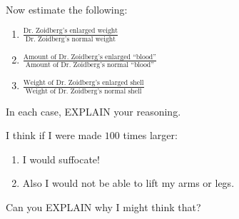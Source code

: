 \documentclass[handout,nooutcomes,noauthor]{ximera}
\begin{document}
\begin{question}
  Now estimate the following:
  \begin{enumerate}
    \item $\frac{\text{Dr.\ Zoidberg's enlarged
        weight}}{\text{Dr.\ Zoidberg's normal weight}}$
    \item $\frac{\text{Amount of Dr.\ Zoidberg's enlarged ``blood''}}{\text{Amount of Dr.\ Zoidberg's normal ``blood''}}$
    \item $\frac{\text{Weight of Dr.\ Zoidberg's enlarged
        shell}}{\text{Weight of Dr.\ Zoidberg's normal shell}}$
  \end{enumerate}
  In each case, EXPLAIN your reasoning.
\end{question}
\mynewpage



\begin{question}
  I think if I were made $100$ times larger:
  \begin{enumerate}
  \item I would suffocate!
  \item Also I would not be able to lift my arms or legs.
  \end{enumerate}
  Can you EXPLAIN why I might think that?
\end{question}
\end{document}
